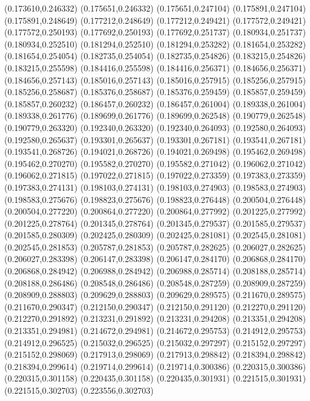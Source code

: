 (0.173610,0.246332)
(0.175651,0.246332)
(0.175651,0.247104)
(0.175891,0.247104)
(0.175891,0.248649)
(0.177212,0.248649)
(0.177212,0.249421)
(0.177572,0.249421)
(0.177572,0.250193)
(0.177692,0.250193)
(0.177692,0.251737)
(0.180934,0.251737)
(0.180934,0.252510)
(0.181294,0.252510)
(0.181294,0.253282)
(0.181654,0.253282)
(0.181654,0.254054)
(0.182735,0.254054)
(0.182735,0.254826)
(0.183215,0.254826)
(0.183215,0.255598)
(0.184416,0.255598)
(0.184416,0.256371)
(0.184656,0.256371)
(0.184656,0.257143)
(0.185016,0.257143)
(0.185016,0.257915)
(0.185256,0.257915)
(0.185256,0.258687)
(0.185376,0.258687)
(0.185376,0.259459)
(0.185857,0.259459)
(0.185857,0.260232)
(0.186457,0.260232)
(0.186457,0.261004)
(0.189338,0.261004)
(0.189338,0.261776)
(0.189699,0.261776)
(0.189699,0.262548)
(0.190779,0.262548)
(0.190779,0.263320)
(0.192340,0.263320)
(0.192340,0.264093)
(0.192580,0.264093)
(0.192580,0.265637)
(0.193301,0.265637)
(0.193301,0.267181)
(0.193541,0.267181)
(0.193541,0.268726)
(0.194021,0.268726)
(0.194021,0.269498)
(0.195462,0.269498)
(0.195462,0.270270)
(0.195582,0.270270)
(0.195582,0.271042)
(0.196062,0.271042)
(0.196062,0.271815)
(0.197022,0.271815)
(0.197022,0.273359)
(0.197383,0.273359)
(0.197383,0.274131)
(0.198103,0.274131)
(0.198103,0.274903)
(0.198583,0.274903)
(0.198583,0.275676)
(0.198823,0.275676)
(0.198823,0.276448)
(0.200504,0.276448)
(0.200504,0.277220)
(0.200864,0.277220)
(0.200864,0.277992)
(0.201225,0.277992)
(0.201225,0.278764)
(0.201345,0.278764)
(0.201345,0.279537)
(0.201585,0.279537)
(0.201585,0.280309)
(0.202425,0.280309)
(0.202425,0.281081)
(0.202545,0.281081)
(0.202545,0.281853)
(0.205787,0.281853)
(0.205787,0.282625)
(0.206027,0.282625)
(0.206027,0.283398)
(0.206147,0.283398)
(0.206147,0.284170)
(0.206868,0.284170)
(0.206868,0.284942)
(0.206988,0.284942)
(0.206988,0.285714)
(0.208188,0.285714)
(0.208188,0.286486)
(0.208548,0.286486)
(0.208548,0.287259)
(0.208909,0.287259)
(0.208909,0.288803)
(0.209629,0.288803)
(0.209629,0.289575)
(0.211670,0.289575)
(0.211670,0.290347)
(0.212150,0.290347)
(0.212150,0.291120)
(0.212270,0.291120)
(0.212270,0.291892)
(0.213231,0.291892)
(0.213231,0.294208)
(0.213351,0.294208)
(0.213351,0.294981)
(0.214672,0.294981)
(0.214672,0.295753)
(0.214912,0.295753)
(0.214912,0.296525)
(0.215032,0.296525)
(0.215032,0.297297)
(0.215152,0.297297)
(0.215152,0.298069)
(0.217913,0.298069)
(0.217913,0.298842)
(0.218394,0.298842)
(0.218394,0.299614)
(0.219714,0.299614)
(0.219714,0.300386)
(0.220315,0.300386)
(0.220315,0.301158)
(0.220435,0.301158)
(0.220435,0.301931)
(0.221515,0.301931)
(0.221515,0.302703)
(0.223556,0.302703)
